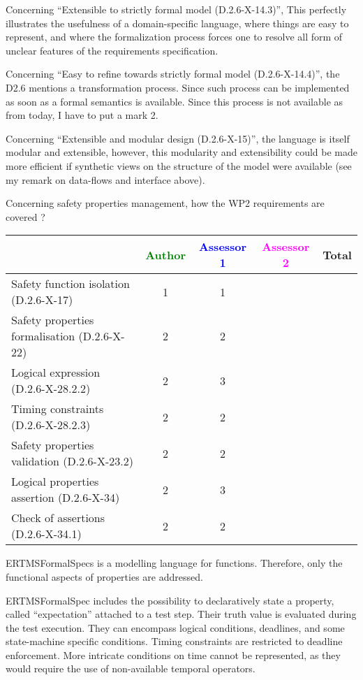 \begin{assessor1}
Concerning "`Extensible to strictly formal model (D.2.6-X-14.3)"', This perfectly illustrates the usefulness of a domain-specific language, where things are easy to represent, and where the formalization process forces one to resolve all form of unclear features of the requirements specification. 

Concerning "`Easy to refine towards strictly formal model (D.2.6-X-14.4)"', the D2.6 mentions a transformation process. Since such process can be implemented as soon as a formal semantics is available. Since this process is not available as from today, I have to put a mark 2. 

Concerning "`Extensible and modular design (D.2.6-X-15)"', the language is itself modular and extensible, however, this modularity and extensibility could be made more efficient if synthetic views on the structure of the model were available (see my remark on data-flows and interface above). 
\end{assessor1}


Concerning safety properties management, how the WP2 requirements are covered ?

\begin{tabular}{|l | c | c | c | c|}
\hline
& \textcolor{green}{Author} & \textcolor{blue}{Assessor 1} & \textcolor{magenta}{Assessor 2} & Total \\
\hline 
Safety function isolation (D.2.6-X-17)  & 1 & 1 & &  \\
\hline 
Safety properties formalisation (D.2.6-X-22)  & 2 & 2 & &  \\
\hline
Logical expression (D.2.6-X-28.2.2)  & 2 & 3 & &  \\
\hline
Timing constraints (D.2.6-X-28.2.3)  & 2 & 2 & &  \\
\hline
Safety properties validation (D.2.6-X-23.2)  & 2 & 2 & &  \\
\hline
Logical properties assertion (D.2.6-X-34)  & 2 & 3 & &  \\
\hline
Check  of assertions (D.2.6-X-34.1)  & 2 & 2 & &  \\
\hline
\end{tabular}

\begin{author_comment}
ERTMSFormalSpecs is a modelling language for functions. Therefore, only the functional aspects of properties are addressed.  
\end{author_comment}

\begin{assessor1}
ERTMSFormalSpec includes the possibility to declaratively state a property, called "`expectation"' attached to a test step. Their truth value is evaluated during the test execution. They can encompass logical conditions, deadlines, and some state-machine specific conditions. 
Timing constraints are restricted to deadline enforcement. More intricate conditions on time cannot be represented, as they would require the use of non-available temporal operators. 
\end{assessor1}

